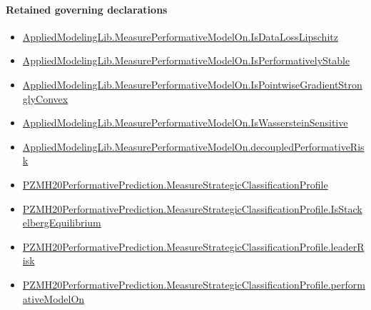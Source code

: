 \documentclass[10pt]{article}
\begin{document}
\paragraph{Retained governing declarations}
\begin{itemize}\raggedright
\item \hyperlink{library-prerequisite-0de79b655cc05174}{Applied\allowbreak{}Modeling\allowbreak{}Lib.\allowbreak{}Measure\allowbreak{}Performative\allowbreak{}Model\allowbreak{}On.\allowbreak{}Is\allowbreak{}Data\allowbreak{}Loss\allowbreak{}Lipschitz}
\item \hyperlink{library-prerequisite-4af6c70f954a80a0}{Applied\allowbreak{}Modeling\allowbreak{}Lib.\allowbreak{}Measure\allowbreak{}Performative\allowbreak{}Model\allowbreak{}On.\allowbreak{}Is\allowbreak{}Performatively\allowbreak{}Stable}
\item \hyperlink{library-prerequisite-eb9ab8e4235e1d28}{Applied\allowbreak{}Modeling\allowbreak{}Lib.\allowbreak{}Measure\allowbreak{}Performative\allowbreak{}Model\allowbreak{}On.\allowbreak{}Is\allowbreak{}Pointwise\allowbreak{}Gradient\allowbreak{}Strongly\allowbreak{}Convex}
\item \hyperlink{library-prerequisite-0e1e192eee739a4b}{Applied\allowbreak{}Modeling\allowbreak{}Lib.\allowbreak{}Measure\allowbreak{}Performative\allowbreak{}Model\allowbreak{}On.\allowbreak{}Is\allowbreak{}Wasserstein\allowbreak{}Sensitive}
\item \hyperlink{library-prerequisite-25221c4f931beacb}{Applied\allowbreak{}Modeling\allowbreak{}Lib.\allowbreak{}Measure\allowbreak{}Performative\allowbreak{}Model\allowbreak{}On.\allowbreak{}decoupled\allowbreak{}Performative\allowbreak{}Risk}
\item \hyperlink{governing-declaration-f8fb952103b1a09e}{PZMH20\allowbreak{}Performative\allowbreak{}Prediction.\allowbreak{}Measure\allowbreak{}Strategic\allowbreak{}Classification\allowbreak{}Profile}
\item \hyperlink{governing-declaration-9427390626db2337}{PZMH20\allowbreak{}Performative\allowbreak{}Prediction.\allowbreak{}Measure\allowbreak{}Strategic\allowbreak{}Classification\allowbreak{}Profile.\allowbreak{}Is\allowbreak{}Stackelberg\allowbreak{}Equilibrium}
\item \hyperlink{governing-declaration-7a6c7adfa87d9f7f}{PZMH20\allowbreak{}Performative\allowbreak{}Prediction.\allowbreak{}Measure\allowbreak{}Strategic\allowbreak{}Classification\allowbreak{}Profile.\allowbreak{}leader\allowbreak{}Risk}
\item \hyperlink{governing-declaration-2d7dd2a2924fa57e}{PZMH20\allowbreak{}Performative\allowbreak{}Prediction.\allowbreak{}Measure\allowbreak{}Strategic\allowbreak{}Classification\allowbreak{}Profile.\allowbreak{}performative\allowbreak{}Model\allowbreak{}On}
\end{itemize}
\end{document}
